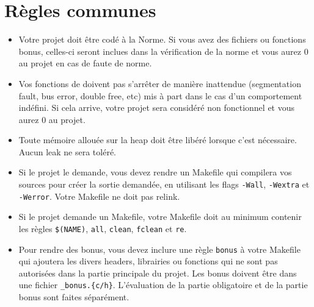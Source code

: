 
\chapter{Règles communes}
    \begin{itemize}
      \item Votre projet doit être codé à la Norme. Si vous avez des fichiers ou
        fonctions bonus, celles-ci seront inclues dans la vérification de la norme
        et vous aurez 0 au projet en cas de faute de norme.

      \item Vos fonctions de doivent pas s'arrêter de manière inattendue (segmentation
      fault, bus error, double free, etc) mis à part dans le cas d'un comportement
      indéfini. Si cela arrive, votre projet sera considéré non fonctionnel et vous 
      aurez 0 au projet.

      \item Toute mémoire allouée sur la heap doit être libéré lorsque c'est nécessaire.
        Aucun leak ne sera toléré.

      \item Si le projet le demande, vous devez rendre un Makefile qui compilera vos 
        sources pour créer la sortie demandée, en utilisant les flags \texttt{-Wall},
        \texttt{-Wextra} et \texttt{-Werror}. Votre Makefile ne doit pas relink.

      \item Si le projet demande un Makefile, votre Makefile doit au minimum
        contenir les règles \texttt{\$(NAME)}, \texttt{all}, \texttt{clean},
        \texttt{fclean} et \texttt{re}.

      \item Pour rendre des bonus, vous devez inclure une règle \texttt{bonus} à votre
        Makefile qui ajoutera les divers headers, librairies ou fonctions qui ne sont
        pas autorisées dans la partie principale du projet. Les bonus doivent être dans
        une fichier \texttt{\*\_bonus.\{c/h\}}. L'évaluation de la partie obligatoire et
        de la partie bonus sont faites séparément.


\end{itemize}
